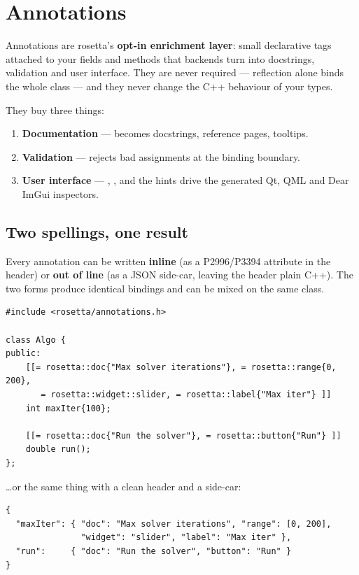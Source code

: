 \chapter{Annotations}
\label{ch:annotations}

Annotations are rosetta's \textbf{opt-in enrichment layer}: small declarative
tags attached to your fields and methods that backends turn into docstrings,
validation and user interface. They are never required --- reflection alone
binds the whole class --- and they never change the C++ behaviour of your types.

They buy three things:

\begin{enumerate}
  \item \textbf{Documentation} ---  becomes docstrings, reference
    pages, tooltips.
  \item \textbf{Validation} ---  rejects bad assignments at the
    binding boundary.
  \item \textbf{User interface} --- , ,
     and the  hints drive the generated Qt, QML
    and Dear ImGui inspectors.
\end{enumerate}

\section{Two spellings, one result}

Every annotation can be written \textbf{inline} (as a P2996/P3394 attribute in
the header) or \textbf{out of line} (as a JSON side-car, leaving the header
plain C++). The two forms produce identical bindings and can be mixed on the
same class.

\begin{lstlisting}[style=cpp]
#include <rosetta/annotations.h>

class Algo {
public:
    [[= rosetta::doc{"Max solver iterations"}, = rosetta::range{0, 200},
       = rosetta::widget::slider, = rosetta::label{"Max iter"} ]]
    int maxIter{100};

    [[= rosetta::doc{"Run the solver"}, = rosetta::button{"Run"} ]]
    double run();
};
\end{lstlisting}

\ldots or the same thing with a clean header and a side-car:

\begin{lstlisting}[style=json]
{
  "maxIter": { "doc": "Max solver iterations", "range": [0, 200],
               "widget": "slider", "label": "Max iter" },
  "run":     { "doc": "Run the solver", "button": "Run" }
}
\end{lstlisting}

